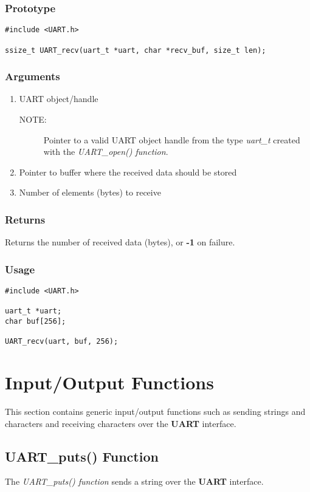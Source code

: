 \documentclass{report}
\begin{document}
\subsubsection*{Prototype}
\begin{lstlisting}
#include <UART.h>

ssize_t UART_recv(uart_t *uart, char *recv_buf, size_t len);
\end{lstlisting}
\subsubsection*{Arguments}
\begin{enumerate}
\item UART object/handle
\begin{description}
\item[NOTE:] Pointer to a valid UART object handle from the type \textit{uart\_t}
created with the \textit{UART\_open() function}.
\end{description}
\item Pointer to buffer where the received data should be stored
\item Number of elements (bytes) to receive
\end{enumerate}
\subsubsection*{Returns}
Returns the number of received data (bytes), or \textbf{-1} on failure.
\subsubsection*{Usage}
\begin{lstlisting}
#include <UART.h>

uart_t *uart;
char buf[256];

UART_recv(uart, buf, 256);
\end{lstlisting}
\section{Input/Output Functions}
This section contains generic input/output functions such as
sending strings and characters and receiving characters over
the \textbf{UART} interface.
\subsection{UART\_puts() Function}
The \textit{UART\_puts() function} sends a string over the
\textbf{UART} interface.
\end{document}
